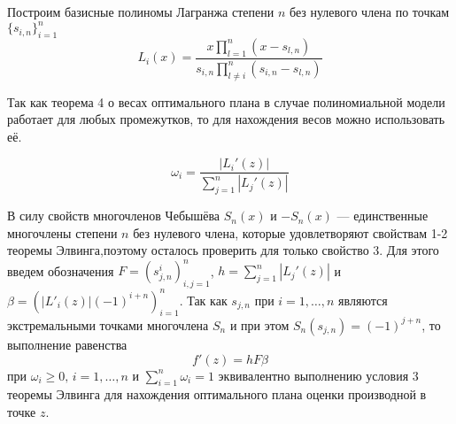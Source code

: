 \documentclass[specialist,
               substylefile = spbu.rtx,
               subf,href,colorlinks=true, 12pt]{disser}
\theoremstyle{definition}
\newcommand\abs[1]{\left\lvert#1\right\rvert}
\begin{document}
	Построим базисные полиномы Лагранжа степени $n$ без нулевого члена по точкам $\{s_{i, n}\}_{i=1}^n$
	\begin{equation*}
		L_{i}(x) = \frac{x \prod_{l=1}^n (x - s_{l,n})}{s_{i, n} \prod_{l \neq i}^n (s_{i,n} - s_{l,n})}
	\end{equation*}	
	
	Так как теорема 4 о весах оптимального плана в случае полиномиальной модели работает для любых промежутков, то для нахождения весов можно использовать её.
	
	\begin{equation*}
		\omega_i = \frac{\abs{L_i'(z)}}{\sum_{j=1}^n \abs{L_j'(z)}}
	\end{equation*}
	
	В силу свойств многочленов Чебышёва $S_n(x)$ и $-S_n(x)$ --- единственные многочлены степени $n$ без нулевого члена, которые удовлетворяют свойствам 1-2 теоремы Элвинга,поэтому осталось проверить для только свойство 3. Для этого введем обозначения $F = \left(s_{j,n}^i\right)^n_{i, j = 1}$, $h = \sum_{j=1}^n \abs{L_j'(z)}$ и $\beta = \left( \abs{L'_i(z)} (-1)^{i+n} \right)_{i=1}^n$. Так как $s_{j, n}$ при $i = 1, \ldots , n$ являются экстремальными точками многочлена $S_n$ и при этом $S_n(s_{j, n}) = (-1)^{j+n}$, то выполнение равенства 
	\begin{equation}
		\label{th:mateq3}
		f'(z) = hF\beta
	\end{equation}
	 при $\omega_i \geqslant 0 , \, i = 1, \ldots, n$ и $ \sum_{i=1}^n \omega_i = 1$ эквивалентно выполнению условия 3 теоремы Элвинга для нахождения оптимального плана оценки производной в точке $z$.
	 
\end{document}
